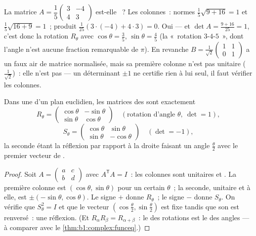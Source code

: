 \begin{example}
\label{ex:b1:euclid:recognize}
La matrice $A = \dfrac15\begin{pmatrix} 3 & -4\\ 4 & 3\end{pmatrix}$
est-elle ~? Les colonnes~: normes $\frac15\sqrt{9 + 16} =
1$ et $\frac15\sqrt{16 + 9} = 1$~; produit $\frac1{25}(3\cdot(-4) +
4\cdot3) = 0$. Oui --- et $\det A = \frac{9 + 16}{25} = 1$, c'est
donc la rotation $R_\theta$ avec $\cos\theta = \frac35$,
$\sin\theta = \frac45$ (la «~rotation $3$-$4$-$5$~», dont
l'angle n'est aucune fraction remarquable de $\pi$). En revanche $B =
\frac{1}{\sqrt2}\begin{pmatrix} 1 & 1\\ 0 & 1\end{pmatrix}$ a un
faux air de matrice normalisée, mais sa première colonne n'est pas
unitaire ($\frac1{\sqrt2}$)~: elle n'est pas  --- un
déterminant $\pm1$ ne certifie rien à lui seul, il faut vérifier
les colonnes.
\end{example}

\begin{theorem}\label{thm:b1:euclid:plane}
Dans une   d'un plan euclidien, les matrices des
 sont exactement
\[
R_\theta = \begin{pmatrix}
\cos\theta & -\sin\theta\\ \sin\theta & \cos\theta
\end{pmatrix}
\quad (\text{rotation d'angle } \theta,\ \det = 1),
\]
\[
S_\theta = \begin{pmatrix}
\cos\theta & \sin\theta\\ \sin\theta & -\cos\theta
\end{pmatrix}
\quad (\det = -1),
\]
la seconde étant la réflexion par rapport à la droite faisant un
angle $\frac\theta2$ avec le premier vecteur de .
\end{theorem}

\begin{proof}
Soit $A = \begin{pmatrix} a & c\\ b & d\end{pmatrix}$ avec
$A^{\mathsf T}A = I$~: les colonnes sont unitaires et .
La première colonne est $(\cos\theta, \sin\theta)$ pour un certain
$\theta$~; la seconde, unitaire et  à elle, est
$\pm(-\sin\theta, \cos\theta)$. Le signe $+$ donne $R_\theta$~; le
signe $-$ donne $S_\theta$. On vérifie que $S_\theta^2 = I$ et que
le vecteur $(\cos\frac\theta2, \sin\frac\theta2)$ est fixe tandis
que son  est renversé~: une réflexion. (Et $R_\alpha
R_\beta = R_{\alpha+\beta}$~: le  des rotations est le 
des angles --- à comparer avec
le \cref{thm:b1:complex:funceq}.)
\end{proof}

